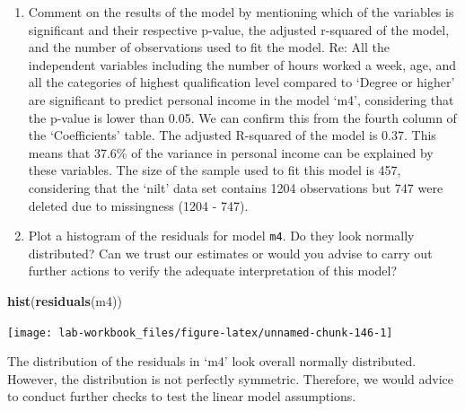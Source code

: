 \documentclass[
]{book}
\newenvironment{Shaded}{\begin{snugshade}}{\end{snugshade}}
\newcommand{\FunctionTok}[1]{\textcolor[rgb]{0.13,0.29,0.53}{\textbf{#1}}}
\newcommand{\NormalTok}[1]{#1}
\providecommand{\tightlist}{%
  \setlength{\itemsep}{0pt}\setlength{\parskip}{0pt}}
\begin{document}
\begin{enumerate}
\def\labelenumi{\arabic{enumi}.}
\setcounter{enumi}{4}
\tightlist
\item
  Comment on the results of the model by mentioning which of the variables is significant and their respective p-value, the adjusted r-squared of the model, and the number of observations used to fit the model.
  Re: All the independent variables including the number of hours worked a week, age, and all the categories of highest qualification level compared to `Degree or higher' are significant to predict personal income in the model `m4', considering that the p-value is lower than 0.05. We can confirm this from the fourth column of the `Coefficients' table. The adjusted R-squared of the model is 0.37. This means that 37.6\% of the variance in personal income can be explained by these variables. The size of the sample used to fit this model is 457, considering that the `nilt' data set contains 1204 observations but 747 were deleted due to missingness (1204 - 747).
\item
  Plot a histogram of the residuals for model \texttt{m4}. Do they look normally distributed? Can we trust our estimates or would you advise to carry out further actions to verify the adequate interpretation of this model?
\end{enumerate}

\begin{Shaded}
\begin{Highlighting}[]
\FunctionTok{hist}\NormalTok{(}\FunctionTok{residuals}\NormalTok{(m4))}
\end{Highlighting}
\end{Shaded}

\begin{flushleft}\texttt{[image: lab-workbook\_files/figure-latex/unnamed-chunk-146-1]} \end{flushleft}

The distribution of the residuals in `m4' look overall normally distributed. However, the distribution is not perfectly symmetric. Therefore, we would advice to conduct further checks to test the linear model assumptions.

  
\end{document}

